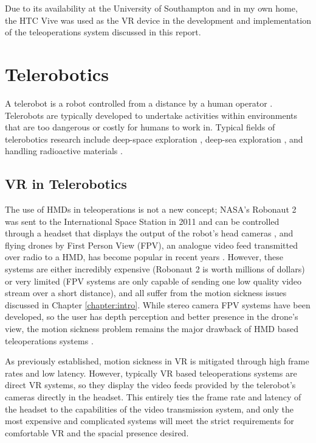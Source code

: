 Due to its availability at the University of Southampton and in my own home, the HTC Vive was used as the VR device in the development and implementation of the teleoperations system discussed in this report. 

\section{Telerobotics}

A telerobot is a robot controlled from a distance by a human operator \cite{NAP4761}. Telerobots are typically developed to undertake activities within environments that are too dangerous or costly for humans to work in. Typical fields of telerobotics research include deep-space exploration \cite{fong2017interactive}, deep-sea exploration \cite{huvenne2018rovs}, and handling radioactive materials \cite{smith2017radiation}.

\subsection{VR in Telerobotics}
\label{subsection:VRTele}

The use of HMDs in teleoperations is not a new concept; NASA's Robonaut 2 was sent to the International Space Station in 2011 and can be controlled through a headset that displays the output of the robot's head cameras \cite{Robonaut}, and flying drones by First Person View (FPV), an analogue video feed transmitted over radio to a HMD, has become popular in recent years \cite{FPV}. However, these systems are either incredibly expensive (Robonaut 2 is worth millions of dollars) or very limited (FPV systems are only capable of sending one low quality video stream over a short distance), and all suffer from the motion sickness issues discussed in Chapter \ref{chapter:intro}. While stereo camera FPV systems have been developed, so the user has depth perception and better presence in the drone's view, the motion sickness problem remains the major drawback of HMD based teleoperations systems \cite{2FPV}.

As previously established, motion sickness in VR is mitigated through high frame rates and low latency. However, typically VR based teleoperations systems are direct VR systems, so they display the video feeds provided by the telerobot's cameras directly in the headset. This entirely ties the frame rate and latency of the headset to the capabilities of the video transmission system, and only the most expensive and complicated systems will meet the strict requirements for comfortable VR and the spacial presence desired.

